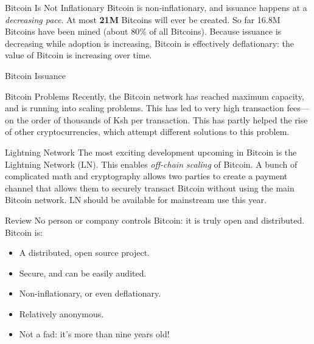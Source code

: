 \documentclass[14pt]{beamer}
\begin{document}
\begin{frame}{Bitcoin Is Not Inflationary}
  Bitcoin is non-inflationary, and issuance happens at a \emph{decreasing pace}.
  \newline
  \newline
  At most \textbf{21M} Bitcoins will ever be created. So far 16.8M
  Bitcoins have been mined (about 80\% of all Bitcoins).
  \newline
  \newline
  Because issuance is decreasing while adoption is increasing,
  Bitcoin is effectively deflationary: the value of Bitcoin is increasing over
  time.
\end{frame}

\begin{frame}{Bitcoin Issuance}
  \begin{figure}
    \resizebox{\columnwidth}{!}{}
  \end{figure}
\end{frame}

\begin{frame}{Bitcoin Problems}
  Recently, the Bitcoin network has reached maximum capacity, and is running
  into scaling problems.
  \newline
  \newline
  This has led to very high transaction fees---on the order of thousands of Ksh
  per transaction. This has partly helped the rise of other cryptocurrencies,
  which attempt different solutions to this problem.
\end{frame}

\begin{frame}{Lightning Network}
  The most exciting development upcoming in Bitcoin is the Lightning Network
  (LN). This enables \emph{off-chain scaling} of Bitcoin.
  \newline
  \newline
  A bunch of complicated math and cryptography allows two parties to create a
  payment channel that allows them to securely transact Bitcoin without using
  the main Bitcoin network.
  \newline
  \newline
  LN should be available for mainstream use this year.
\end{frame}

\begin{frame}{Review}
  No person or company controls Bitcoin: it is truly open and distributed.
  \newline
  \newline
  Bitcoin is:
  \begin{itemize}
  \item A distributed, open source project.
  \item Secure, and can be easily audited.
  \item Non-inflationary, or even deflationary.
  \item Relatively anonymous.
  \item Not a fad: it's more than nine years old!
  \end{itemize}
\end{frame}
\end{document}
